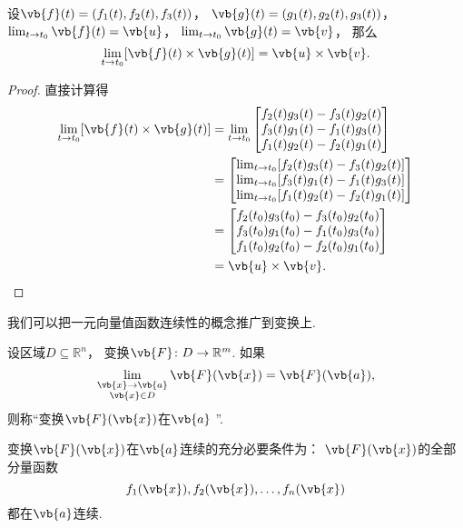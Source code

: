 \begin{theorem}
设\(\vb{f}(t) = (f_1(t),f_2(t),f_3(t))\)，
\(\vb{g}(t) = (g_1(t),g_2(t),g_3(t))\)，
\(\lim_{t \to t_0} \vb{f}(t) = \vb{u}\)，
\(\lim_{t \to t_0} \vb{g}(t) = \vb{v}\)，
那么\[
	\lim_{t \to t_0} [\vb{f}(t) \times \vb{g}(t)]
	= \vb{u} \times \vb{v}.
\]
\begin{proof}
直接计算得\begin{align*}
	\lim_{t \to t_0} [\vb{f}(t) \times \vb{g}(t)]
	&= \lim_{t \to t_0} \begin{bmatrix}
		f_2(t) g_3(t) - f_3(t) g_2(t) \\
		f_3(t) g_1(t) - f_1(t) g_3(t) \\
		f_1(t) g_2(t) - f_2(t) g_1(t) \\
	\end{bmatrix} \\
	&= \begin{bmatrix}
		\lim_{t \to t_0} [f_2(t) g_3(t) - f_3(t) g_2(t)] \\
		\lim_{t \to t_0} [f_3(t) g_1(t) - f_1(t) g_3(t)] \\
		\lim_{t \to t_0} [f_1(t) g_2(t) - f_2(t) g_1(t)] \\
	\end{bmatrix} \\
	&= \begin{bmatrix}
		f_2(t_0) g_3(t_0) - f_3(t_0) g_2(t_0) \\
		f_3(t_0) g_1(t_0) - f_1(t_0) g_3(t_0) \\
		f_1(t_0) g_2(t_0) - f_2(t_0) g_1(t_0) \\
	\end{bmatrix} \\
	&= \vb{u} \times \vb{v}.
	\qedhere
\end{align*}
\end{proof}
\end{theorem}

我们可以把一元向量值函数连续性的概念推广到变换上.
\begin{definition}
设区域\(D \subseteq \mathbb{R}^n\)，
变换\(\vb{F}\colon D \to \mathbb{R}^m\).
如果\[
	\lim_{\substack{
		\vb{x}\to\vb{a} \\
		\vb{x} \in D
	}} \vb{F}(\vb{x})
	= \vb{F}(\vb{a}),
\]
则称“变换\(\vb{F}(\vb{x})\)在\(\vb{a}\) ”.
\end{definition}

\begin{theorem}
变换\(\vb{F}(\vb{x})\)在\(\vb{a}\)连续的充分必要条件为：
\(\vb{F}(\vb{x})\)的全部分量函数\[
	f_1(\vb{x}),f_2(\vb{x}),\dotsc,f_n(\vb{x})
\]都在\(\vb{a}\)连续.
\end{theorem}

